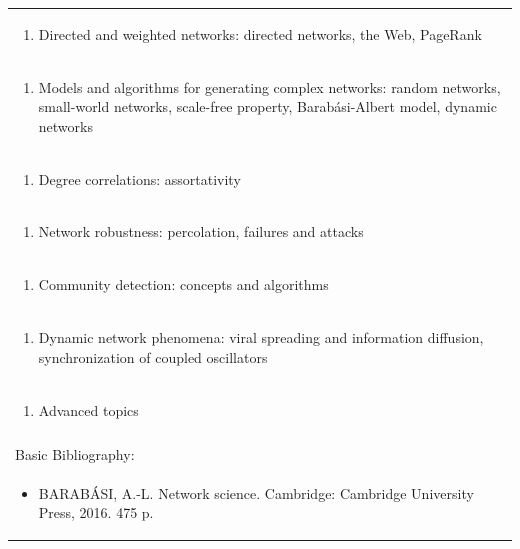 \documentclass[11pt]{article}
\begin{document}
\begin{center}
\begin{longtable}{|p{4cm}|p{4cm}|p{4cm}|p{4cm}|}
\multicolumn{4}{|p{\dimexpr 16cm + 6\tabcolsep\relax}|}{\begin{enumerate}[start=2]\item Directed and weighted networks: directed networks, the Web, PageRank\end{enumerate}}\\
\multicolumn{4}{|p{\dimexpr 16cm + 6\tabcolsep\relax}|}{\begin{enumerate}[start=3]\item Models and algorithms for generating complex networks: random networks, small-world networks, scale-free property, Barabási-Albert model, dynamic networks\end{enumerate}}\\
\multicolumn{4}{|p{\dimexpr 16cm + 6\tabcolsep\relax}|}{\begin{enumerate}[start=4]\item Degree correlations: assortativity\end{enumerate}}\\
\multicolumn{4}{|p{\dimexpr 16cm + 6\tabcolsep\relax}|}{\begin{enumerate}[start=5]\item Network robustness: percolation, failures and attacks\end{enumerate}}\\
\multicolumn{4}{|p{\dimexpr 16cm + 6\tabcolsep\relax}|}{\begin{enumerate}[start=6]\item Community detection: concepts and algorithms\end{enumerate}}\\
\multicolumn{4}{|p{\dimexpr 16cm + 6\tabcolsep\relax}|}{\begin{enumerate}[start=7]\item Dynamic network phenomena: viral spreading and information diffusion, synchronization of coupled oscillators\end{enumerate}}\\
\multicolumn{4}{|p{\dimexpr 16cm + 6\tabcolsep\relax}|}{\begin{enumerate}[start=8]\item Advanced topics\end{enumerate}}\\
\multicolumn{4}{|p{\dimexpr 16cm + 6\tabcolsep\relax}|}{}\\
\hline
\multicolumn{4}{|p{16cm}|}{Basic Bibliography:}\\*
\multicolumn{4}{|p{\dimexpr 16cm + 6\tabcolsep\relax}|}{\begin{itemize}\item BARABÁSI, A.-L. Network science. Cambridge: Cambridge University Press, 2016. 475 p.\end{itemize}}\\

\end{longtable}
\end{center}
\end{document}
